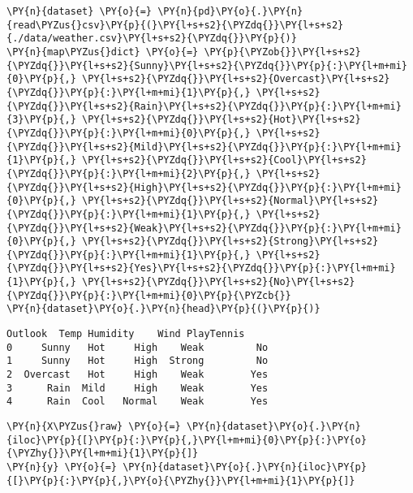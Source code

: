     \begin{tcolorbox}[breakable, size=fbox, boxrule=1pt, pad at break*=1mm,colback=cellbackground, colframe=cellborder]
\begin{Verbatim}[commandchars=\\\{\}]
\PY{n}{dataset} \PY{o}{=} \PY{n}{pd}\PY{o}{.}\PY{n}{read\PYZus{}csv}\PY{p}{(}\PY{l+s+s2}{\PYZdq{}}\PY{l+s+s2}{./data/weather.csv}\PY{l+s+s2}{\PYZdq{}}\PY{p}{)}
\PY{n}{map\PYZus{}dict} \PY{o}{=} \PY{p}{\PYZob{}}\PY{l+s+s2}{\PYZdq{}}\PY{l+s+s2}{Sunny}\PY{l+s+s2}{\PYZdq{}}\PY{p}{:}\PY{l+m+mi}{0}\PY{p}{,} \PY{l+s+s2}{\PYZdq{}}\PY{l+s+s2}{Overcast}\PY{l+s+s2}{\PYZdq{}}\PY{p}{:}\PY{l+m+mi}{1}\PY{p}{,} \PY{l+s+s2}{\PYZdq{}}\PY{l+s+s2}{Rain}\PY{l+s+s2}{\PYZdq{}}\PY{p}{:}\PY{l+m+mi}{3}\PY{p}{,} \PY{l+s+s2}{\PYZdq{}}\PY{l+s+s2}{Hot}\PY{l+s+s2}{\PYZdq{}}\PY{p}{:}\PY{l+m+mi}{0}\PY{p}{,} \PY{l+s+s2}{\PYZdq{}}\PY{l+s+s2}{Mild}\PY{l+s+s2}{\PYZdq{}}\PY{p}{:}\PY{l+m+mi}{1}\PY{p}{,} \PY{l+s+s2}{\PYZdq{}}\PY{l+s+s2}{Cool}\PY{l+s+s2}{\PYZdq{}}\PY{p}{:}\PY{l+m+mi}{2}\PY{p}{,} \PY{l+s+s2}{\PYZdq{}}\PY{l+s+s2}{High}\PY{l+s+s2}{\PYZdq{}}\PY{p}{:}\PY{l+m+mi}{0}\PY{p}{,} \PY{l+s+s2}{\PYZdq{}}\PY{l+s+s2}{Normal}\PY{l+s+s2}{\PYZdq{}}\PY{p}{:}\PY{l+m+mi}{1}\PY{p}{,} \PY{l+s+s2}{\PYZdq{}}\PY{l+s+s2}{Weak}\PY{l+s+s2}{\PYZdq{}}\PY{p}{:}\PY{l+m+mi}{0}\PY{p}{,} \PY{l+s+s2}{\PYZdq{}}\PY{l+s+s2}{Strong}\PY{l+s+s2}{\PYZdq{}}\PY{p}{:}\PY{l+m+mi}{1}\PY{p}{,} \PY{l+s+s2}{\PYZdq{}}\PY{l+s+s2}{Yes}\PY{l+s+s2}{\PYZdq{}}\PY{p}{:}\PY{l+m+mi}{1}\PY{p}{,} \PY{l+s+s2}{\PYZdq{}}\PY{l+s+s2}{No}\PY{l+s+s2}{\PYZdq{}}\PY{p}{:}\PY{l+m+mi}{0}\PY{p}{\PYZcb{}}
\PY{n}{dataset}\PY{o}{.}\PY{n}{head}\PY{p}{(}\PY{p}{)}
\end{Verbatim}
\end{tcolorbox}

            \begin{tcolorbox}[breakable, size=fbox, boxrule=.5pt, pad at break*=1mm, opacityfill=0]
\begin{Verbatim}[commandchars=\\\{\}]
    Outlook  Temp Humidity    Wind PlayTennis
0     Sunny   Hot     High    Weak         No
1     Sunny   Hot     High  Strong         No
2  Overcast   Hot     High    Weak        Yes
3      Rain  Mild     High    Weak        Yes
4      Rain  Cool   Normal    Weak        Yes
\end{Verbatim}
\end{tcolorbox}
        
    \begin{tcolorbox}[breakable, size=fbox, boxrule=1pt, pad at break*=1mm,colback=cellbackground, colframe=cellborder]
\begin{Verbatim}[commandchars=\\\{\}]
\PY{n}{X\PYZus{}raw} \PY{o}{=} \PY{n}{dataset}\PY{o}{.}\PY{n}{iloc}\PY{p}{[}\PY{p}{:}\PY{p}{,}\PY{l+m+mi}{0}\PY{p}{:}\PY{o}{\PYZhy{}}\PY{l+m+mi}{1}\PY{p}{]}
\PY{n}{y} \PY{o}{=} \PY{n}{dataset}\PY{o}{.}\PY{n}{iloc}\PY{p}{[}\PY{p}{:}\PY{p}{,}\PY{o}{\PYZhy{}}\PY{l+m+mi}{1}\PY{p}{]}
\end{Verbatim}
\end{tcolorbox}

